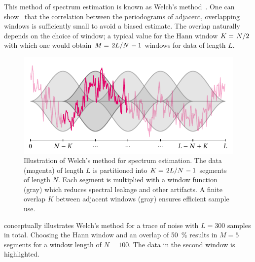 This method of spectrum estimation is known as Welch's method~\cite{Welch1967}.
One can show~\cite{Welch1967} that the correlation between the periodograms of adjacent, overlapping windows is sufficiently small to avoid a biased estimate.
The overlap naturally depends on the choice of window; a typical value for the Hann window $K = \flatfrac{N}{2}$ with which one would obtain $M = \flatfrac{2L}{N} - 1$ windows for data of length $L$.
\begin{figure}
    \centering
    \includegraphics[width=\textwidth]{img/pdf/spectrometer/welch}
    \caption[]{
        Illustration of Welch's method for spectrum estimation.
        The data (magenta) of length $L$ is partitioned into $K = \flatfrac{2L}{N} - 1$ segments of length $N$.
        Each segment is multiplied with a window function (gray) which reduces spectral leakage and other artifacts.
        A finite overlap $K$ between adjacent windows (gray) ensures efficient sample use.
    }
    \label{fig:speck:welch}
\end{figure}

 conceptually illustrates Welch's method for a trace of \oneoverf noise with $L = 300$ samples in total.
Choosing the Hann window and an overlap of \qty{50}{\percent} results in $M=5$ segments for a window length of $N=100$.
The data in the second window is highlighted.

